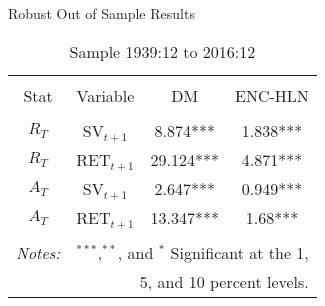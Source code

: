 \documentclass[handout]{beamer}
\begin{document}
\begin{frame}{Robust Out of Sample Results}
	\vspace{-12pt}
	\begin{table}
		\caption{Sample 1939:12 to 2016:12}
		\vspace{-6pt}
		\begin{adjustbox}{center,max height=\totalheight}
			\begin{tabular}{cccc}
				\hline\\[-1.8ex]
				Stat & Variable & DM & ENC-HLN \\
				\hline\\[-1.8ex]
				$R_{T}$ & SV$_{t+1}$ & 8.874*** & 1.838*** \\
				$R_{T}$ & RET$_{t+1}$ & 29.124*** & 4.871*** \\
				$A_{T}$ & SV$_{t+1}$ & 2.647*** & 0.949*** \\
				$A_{T}$ & RET$_{t+1}$ & 13.347*** & 1.68*** \\
				\hline\\[-1.8ex]
				\textit{Notes:} & \multicolumn{3}{r}{$^{***}$,$^{**}$, and $^{*}$ Significant at the 1,}\\
				& \multicolumn{3}{r}{ 5, and 10 percent levels.}
			\end{tabular}
		\end{adjustbox}

\end{table}
\end{frame}
\end{document}
